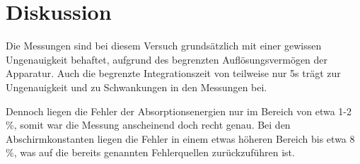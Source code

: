 \section{Diskussion}
\label{sec:Diskussion}
Die Messungen sind bei diesem Versuch grundsätzlich mit einer gewissen Ungenauigkeit behaftet,
aufgrund des begrenzten Auflösungsvermögen der Apparatur. Auch die begrenzte Integrationszeit von
teilweise nur 5s trägt zur Ungenauigkeit und zu Schwankungen in den Messungen bei.


\noindent Dennoch liegen die Fehler der Absorptionsenergien nur im Bereich von etwa 1-2 \%,
somit war die Messung anscheinend doch recht genau. Bei den Abschirmkonstanten liegen
die Fehler in einem etwas höheren Bereich bis etwa 8 \%, was auf die bereits genannten Fehlerquellen
zurückzuführen ist.
